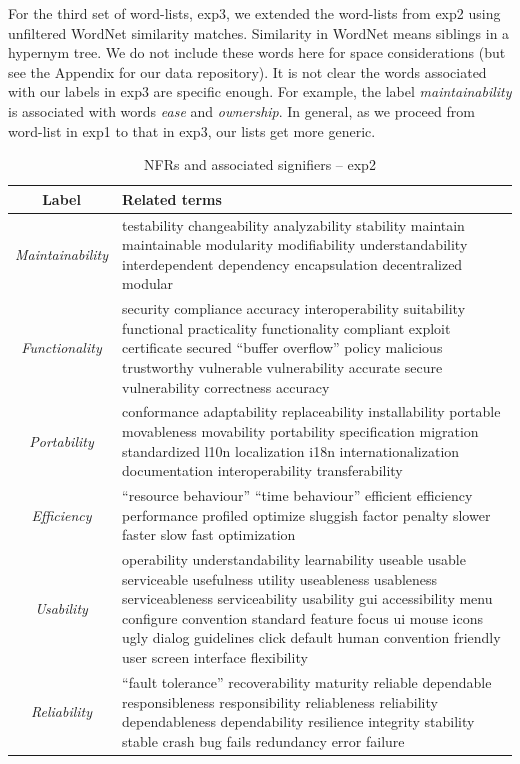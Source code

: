 \documentclass[]{sig-alternate}
\begin{document}
For the third set of word-lists, \textsf{exp3}, we extended the word-lists from \textsf{exp2} using unfiltered WordNet similarity matches. 
Similarity in WordNet means siblings in a hypernym tree. 
We do not include these words here for space considerations (but see the Appendix for our data repository). 
It is not clear the words associated with our labels in \textsf{exp3} are specific enough. For example, the label \emph{maintainability} is associated with words \emph{ease} and \emph{ownership}. In general, as we proceed from word-list in \textsf{exp1} to that in \textsf{exp3}, our lists get more generic.

\begin{table}
	\centering
\begin{tabular}{c|p{11cm}}
\toprule
\textbf{Label} & \textbf{Related terms} \\
\midrule
\emph{Maintainability} &
testability changeability analyzability stability maintain maintainable modularity modifiability understandability interdependent dependency encapsulation decentralized modular\\ \hline
\emph{Functionality} &
security compliance accuracy interoperability suitability functional practicality functionality compliant exploit certificate secured ``buffer overflow'' policy malicious trustworthy vulnerable vulnerability accurate secure vulnerability correctness accuracy\\ \hline
\emph{Portability} &
conformance adaptability replaceability installability portable movableness movability portability specification migration standardized l10n localization i18n internationalization documentation interoperability transferability\\ \hline
\emph{Efficiency} &
``resource behaviour'' ``time behaviour'' efficient efficiency performance profiled optimize sluggish factor penalty slower faster slow fast optimization\\ \hline
\emph{Usability} &
operability understandability learnability useable usable serviceable usefulness utility useableness usableness serviceableness serviceability usability gui accessibility menu configure convention standard feature focus ui mouse icons ugly dialog guidelines click default human convention friendly user screen interface flexibility\\ \hline
\emph{Reliability} &
``fault tolerance'' recoverability maturity reliable dependable responsibleness responsibility reliableness reliability dependableness dependability resilience integrity stability stable crash bug fails redundancy error failure\\ 
\bottomrule
\end{tabular}
	\caption{NFRs and associated signifiers -- \textsf{exp2}}
	\label{tbl:wnsig}

\end{table}
\end{document}
